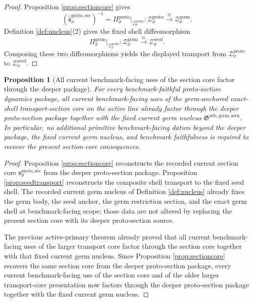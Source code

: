 \documentclass[11pt]{article}
\newcommand{\SeedShell}[1]{\mathcal Z_{#1}^{\mathrm{seed}}}
\newcommand{\GermNucleus}{\mathfrak G^{\mathrm{sub,germ,zstn}}}
\newcommand{\GermProj}[1]{\Pi_{#1}^{\mathrm{germ}}}
\newcommand{\GermShell}[1]{\mathcal Z_{#1}^{\mathrm{germ}}}
\newcommand{\ProtoProj}[1]{\Pi_{#1}^{\mathrm{proto}}}
\newcommand{\ProtoShell}[1]{\mathcal Z_{#1}^{\mathrm{proto}}}
\newcommand{\ProtoTransportSec}[1]{\mathfrak s_{#1}^{\mathrm{proto,sec}}}
\newcommand{\InducedTransportSec}[1]{\widehat{\mathfrak s}_{#1}^{\mathrm{proto,sec}}}
\newtheorem{proposition}{Proposition}
\begin{document}
\begin{proof}
Proposition \ref{prop:sectioncore} gives
\[
\left(\InducedTransportSec{\sigma}\right)^{-1}
=
\ProtoProj{\sigma}\big|_{\ProtoShell{\sigma}}
:
\ProtoShell{\sigma}\xrightarrow{\cong}\GermShell{\sigma}.
\]
Definition \ref{def:nucleus}(2) gives the fixed shell diffeomorphism
\[
\GermProj{\sigma}\big|_{\GermShell{\sigma}}
:
\GermShell{\sigma}\xrightarrow{\cong}\SeedShell{\sigma}.
\]
Composing these two diffeomorphisms yields the displayed transport from \(\ProtoShell{\sigma}\) to \(\SeedShell{\sigma}\).
\end{proof}

\begin{proposition}[All current benchmark-facing uses of the section core factor through the deeper package]
\label{prop:downstream}
For every benchmark-faithful proto-section dynamics package, all current benchmark-facing uses of the germ-anchored exact-shell transport-section core on the active line already factor through the deeper proto-section package together with the fixed current germ nucleus \(\GermNucleus\). In particular, no additional primitive benchmark-facing datum beyond the deeper package, the fixed current germ nucleus, and benchmark faithfulness is required to recover the present section-core consequences.
\end{proposition}

\begin{proof}
Proposition \ref{prop:sectioncore} reconstructs the recorded current section core \(\ProtoTransportSec{\sigma}\) from the deeper proto-section package. Proposition \ref{prop:seedtransport} reconstructs the composite shell transport to the fixed seed shell. The recorded current germ nucleus of Definition \ref{def:nucleus} already fixes the germ body, the seed anchor, the germ restriction section, and the exact germ shell at benchmark-facing scope; those data are not altered by replacing the present section core with its deeper proto-section source.

The previous active-primary theorem already proved that all current benchmark-facing uses of the larger transport core factor through the section core together with that fixed current germ nucleus. Since Proposition \ref{prop:sectioncore} recovers the same section core from the deeper proto-section package, every current benchmark-facing use of the section core and of the older larger transport-core presentation now factors through the deeper proto-section package together with the fixed current germ nucleus.
\end{proof}
\end{document}
